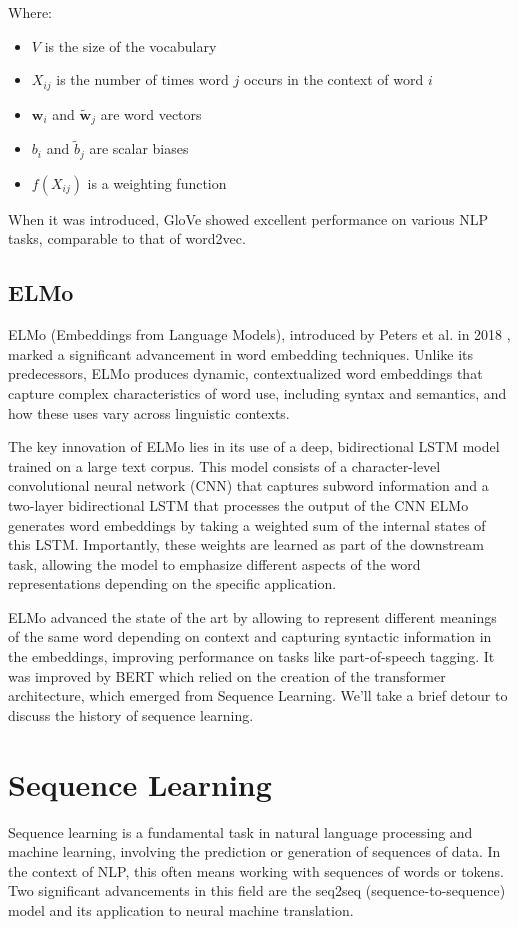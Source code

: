 \documentclass[a4paper, oneside]{discothesis}
\begin{document}
Where:
\begin{itemize}
    \item $V$ is the size of the vocabulary
    \item $X_{ij}$ is the number of times word $j$ occurs in the context of word $i$
    \item $\mathbf{w}_i$ and $\tilde{\mathbf{w}}_j$ are word vectors
    \item $b_i$ and $\tilde{b}_j$ are scalar biases
    \item $f(X_{ij})$ is a weighting function
\end{itemize}

When it was introduced, GloVe showed excellent performance on various NLP tasks, comparable to that of word2vec. 

\subsection{ELMo}
ELMo (Embeddings from Language Models), introduced by Peters et al. in 2018 \cite{peters2018deep}, marked a significant advancement in word embedding techniques. Unlike its predecessors, ELMo produces dynamic, contextualized word embeddings that capture complex characteristics of word use, including syntax and semantics, and how these uses vary across linguistic contexts.

The key innovation of ELMo lies in its use of a deep, bidirectional LSTM model trained on a large text corpus. This model consists of a character-level convolutional neural network (CNN) that captures subword information and a two-layer bidirectional LSTM that processes the output of the CNN
ELMo generates word embeddings by taking a weighted sum of the internal states of this LSTM. Importantly, these weights are learned as part of the downstream task, allowing the model to emphasize different aspects of the word representations depending on the specific application.

ELMo advanced the state of the art by allowing to represent different meanings of the same word depending on context and capturing syntactic information in the embeddings, improving performance on tasks like part-of-speech tagging. It was improved by BERT which relied on the creation of the transformer architecture, which emerged from Sequence Learning. We'll take a brief detour to discuss the history of sequence learning. 

\section{Sequence Learning}
Sequence learning is a fundamental task in natural language processing and machine learning, involving the prediction or generation of sequences of data. In the context of NLP, this often means working with sequences of words or tokens. Two significant advancements in this field are the seq2seq (sequence-to-sequence) model and its application to neural machine translation.
\end{document}
